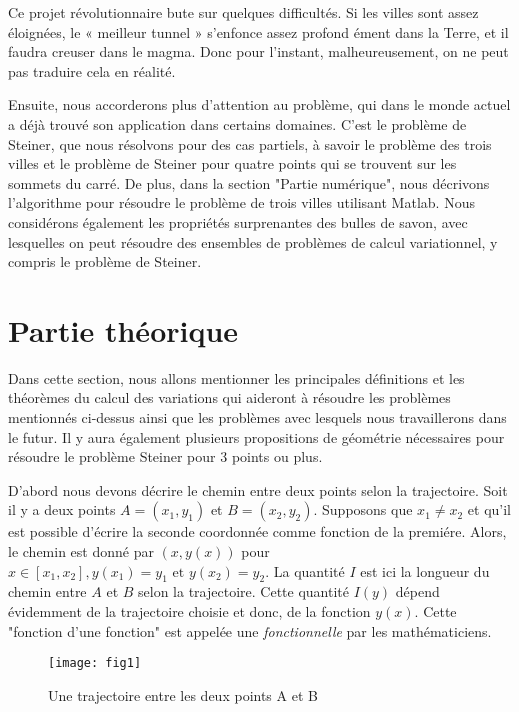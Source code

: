\documentclass[10pt,a4paper]{article}%
\theoremstyle{theorem}
\theoremstyle{definition}
\begin{document}
	Ce projet révolutionnaire bute sur quelques difficultés. Si les villes sont assez  éloignées, le « meilleur tunnel » s'enfonce assez profond ément dans la Terre, et il faudra creuser dans le magma. Donc pour l'instant, malheureusement, on ne peut pas traduire cela en réalité.
	 
	Ensuite, nous accorderons plus d'attention au problème, qui dans le monde actuel a déjà trouvé son application dans certains domaines. C'est le problème de Steiner, que nous résolvons pour des cas partiels, à savoir le problème des trois villes et le problème de Steiner pour quatre points qui se trouvent sur les sommets du carré. De plus, dans la section "Partie numérique", nous décrivons l'algorithme pour résoudre le problème de trois villes utilisant Matlab. Nous considérons également les propriétés surprenantes des bulles de savon, avec lesquelles on peut résoudre des ensembles de problèmes de calcul variationnel, y compris le problème de Steiner.

	
	\section{Partie théorique}
	
	Dans cette section, nous allons mentionner les principales définitions et les théorèmes du calcul des variations qui aideront à résoudre les problèmes mentionnés ci-dessus ainsi que les problèmes avec lesquels nous travaillerons dans le futur. Il y aura également plusieurs propositions de géométrie nécessaires pour résoudre le problème Steiner pour 3 points ou plus.
	
	
	D'abord nous devons décrire le chemin entre deux points selon la trajectoire. Soit il y a deux points $A=(x_1,y_1)$ et $B=(x_2,y_2)$. Supposons que $x_1 \neq x_2$ et qu'il est possible d'écrire la seconde coordonnée comme fonction de la premiére. Alors, le chemin est donné par $(x,y(x))$ pour $x \in [x_1,x_2], y(x_1)=y_1 \text{ et } y(x_2)=y_2.$ La quantité $I$ est ici la longueur du chemin entre $A$ et $B$ selon la trajectoire. Cette quantité $I(y)$ dépend évidemment de la trajectoire choisie et donc, de la fonction $y(x)$. Cette "fonction d'une fonction" est appelée une \textit{fonctionnelle} par les mathématiciens. 
	
	\begin{figure}[h]
		\begin{center}
			\texttt{[image: fig1]}
		\end{center}
		\caption{Une trajectoire entre les deux points A et B}\label{chemin.figure}
	\end{figure}
	
\end{document}
